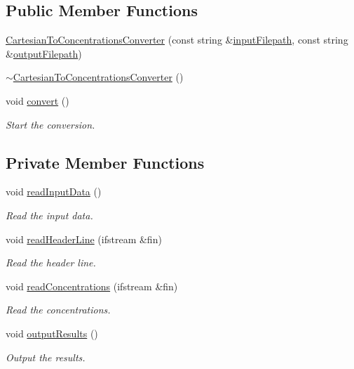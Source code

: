 \subsection*{Public Member Functions}
\begin{DoxyCompactItemize}
\item 
\hyperlink{classmultiscale_1_1video_1_1CartesianToConcentrationsConverter_ae2f641fe6c2af730a5aedc83f4bc1244}{Cartesian\-To\-Concentrations\-Converter} (const string \&\hyperlink{classmultiscale_1_1video_1_1CartesianToConcentrationsConverter_affebbc7e1c67692bd529f19fc0451e58}{input\-Filepath}, const string \&\hyperlink{classmultiscale_1_1video_1_1CartesianToConcentrationsConverter_a9215448e33876a581b206a89b6651fd0}{output\-Filepath})
\item 
\hyperlink{classmultiscale_1_1video_1_1CartesianToConcentrationsConverter_a4250cb00af6f3c254c0577479ae25553}{$\sim$\-Cartesian\-To\-Concentrations\-Converter} ()
\item 
void \hyperlink{classmultiscale_1_1video_1_1CartesianToConcentrationsConverter_a27de97c7e35097bd17453fd07f33a6f1}{convert} ()
\begin{DoxyCompactList}\small\item\em Start the conversion. \end{DoxyCompactList}\end{DoxyCompactItemize}
\subsection*{Private Member Functions}
\begin{DoxyCompactItemize}
\item 
void \hyperlink{classmultiscale_1_1video_1_1CartesianToConcentrationsConverter_a94094cdeaf0f48164911188709dc0e2f}{read\-Input\-Data} ()
\begin{DoxyCompactList}\small\item\em Read the input data. \end{DoxyCompactList}\item 
void \hyperlink{classmultiscale_1_1video_1_1CartesianToConcentrationsConverter_a2e9967ae6fb2efc39ed377aca2fa222c}{read\-Header\-Line} (ifstream \&fin)
\begin{DoxyCompactList}\small\item\em Read the header line. \end{DoxyCompactList}\item 
void \hyperlink{classmultiscale_1_1video_1_1CartesianToConcentrationsConverter_a9134409b814fafe62c896c6b473bc574}{read\-Concentrations} (ifstream \&fin)
\begin{DoxyCompactList}\small\item\em Read the concentrations. \end{DoxyCompactList}\item 
void \hyperlink{classmultiscale_1_1video_1_1CartesianToConcentrationsConverter_a346e054266585ae6922d159b8d5fb804}{output\-Results} ()
\begin{DoxyCompactList}\small\item\em Output the results. \end{DoxyCompactList}\end{DoxyCompactItemize}
